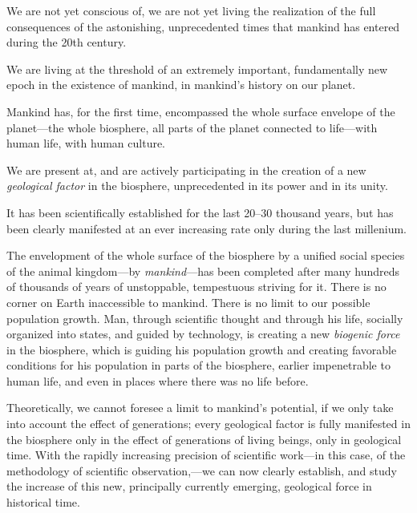 \label{ch:2}

\Section %
We are not yet conscious of, we are not yet living the realization of the
full consequences of the astonishing, unprecedented times that mankind has
entered during the 20th century.

We are living at the threshold of an extremely important, fundamentally new
epoch in the existence of mankind, in mankind's history on our planet.

Mankind has, for the first time, encompassed the whole surface envelope of the
planet---the whole biosphere, all parts of the planet connected to life---with
human life, with human culture.

We are present at, and are actively participating in the creation of a new
\emph{geological factor} in the biosphere, unprecedented in its power and in
its unity.

It has been scientifically established for the last 20--30 thousand years, but
has been clearly manifested at an ever increasing rate only during the last
millenium.

The envelopment of the whole surface of the biosphere by a unified social
species of the animal kingdom---by \emph{mankind}---has been completed after
many hundreds of thousands of years of unstoppable, tempestuous striving for
it.  There is no corner on Earth inaccessible to mankind.  There is no limit to
our possible population growth.  Man, through scientific thought and through
his life, socially organized into states, and guided by technology, is creating
a new \emph{biogenic force} in the biosphere, which is guiding his population
growth and creating favorable conditions for his population in parts of the
biosphere, earlier impenetrable to human life, and even in places where there
was no life before.

Theoretically, we cannot foresee a limit to mankind's potential, if we only
take into account the effect of generations; every geological factor is fully
manifested in the biosphere only in the effect of generations of living beings,
only in geological time.  With the rapidly increasing precision of scientific
work---in this case, of the methodology of scientific observation,---we can now
clearly establish, and study the increase of this new, principally currently
emerging, geological force in historical time.

